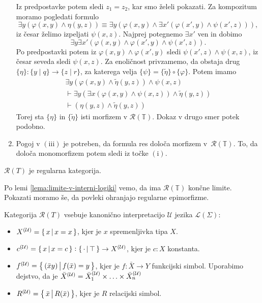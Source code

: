\documentclass[../kategoricna_logika.tex]{subfiles}
\begin{document}
\begin{dokaz}
\begin{enumerate}[label=(\roman*)]
    Iz predpostavke potem sledi $z_1 = z_2$, kar smo želeli pokazati.
    Za kompozitum moramo pogledati formulo
    \[ \exists y(\varphi(x,y) \land \eta(y,z)) \equiv
      \exists y(\varphi(x,y) \land \exists x'(\varphi(x',y) \land \psi(x',z)) ), \]
    iz česar želimo izpeljati $\psi(x,z)$. Najprej potegnemo $\exists x'$ ven in dobimo
    \[\exists y \exists x'( \varphi(x,y) \land \varphi(x',y) \land \psi(x',z)). \]
    Po predpostavki potem iz $\varphi(x,y) \land \varphi(x',y)$ sledi
    $\psi(x',z) \land \psi(x,z)$, iz česar seveda sledi $\psi(x,z)$.
    Za enoličnost privzamemo, da obstaja drug $\{\eta\} : \{y \mid q\} \to \{z \mid r\}$,
    za katerega velja $\{\psi\} = \{\tilde{\eta}\} \circ \{\varphi\}$. Potem imamo
    \begin{align*}
      \exists y (\varphi(x,y) \land \tilde{\eta}(y,z)) \land \psi(x,z) \\
      \vdash \exists y (\exists x(\varphi(x,y) \land \psi(x,z)) \land \tilde{\eta}(y,z)) \\
      \vdash (\eta(y,z) \land \tilde{\eta}(y,z))
    \end{align*}
    Torej sta $\{\eta\}$ in $\{\tilde{\eta}\}$ isti morfizem v $\mathcal{R}(\mathbb{T})$.
    Dokaz v drugo smer potek podobno.

  \item Pogoj v $(\mathrm{iii})$ je potreben,
    da formula res določa morfizem v~$\mathcal{R}(\mathbb{T})$.
    To, da določa monomorfizem potem sledi iz točke $(\mathrm{i})$.
  \end{enumerate}
  
\end{dokaz}
\begin{trditev}
  $\mathcal{R}(T)$ je regularna kategorija.
\end{trditev}
\begin{dokaz}
  Po lemi \ref{lema:limite-v-interni-logiki} vemo, da ima $\mathcal{R}(\mathbb{T})$
  končne limite. Pokazati moramo še, da povleki ohranjajo regularne epimorfizme.
\end{dokaz}
\begin{definicija}
  Kategorija $\mathcal{R}(T)$ vsebuje kanonično interpretacijo $\mathcal{U}$ jezika $\mathcal{L}(\Sigma)$:
  \begin{itemize}
    \item $\interp[\mathcal{U}]{X} = \set{x\,\middle|\, x = x}$, kjer je $x$ spremenljivka tipa $X$.
    \item $\interp[\mathcal{U}]{c} = \set{x\,\middle|\, x = c} : \set{\cdot\,\middle|\, \top} \to \interp[\mathcal{U}]{X}$, kjer je $c:X$ konstanta.
    \item $\interp[\mathcal{U}]{f} = \set{(\bar{x}y)\,\middle|\, f(\bar{x}) = y}$,
      kjer je $f : \bar{X}\to Y$ funkcijski simbol. Uporabimo dejstvo, da je $\bar{X}^{(\mathcal{U})} = \interp[\mathcal{U}]{\bar{X}_1} \times \ldots \times \interp[\mathcal{U}]{\bar{X}_n}$
    \item $\interp[\mathcal{U}]{R} = \set{\bar{x}\,\middle|\, R(\bar{x})}$, kjer je $R$ relacijski simbol.
  \end{itemize}
\end{definicija}
\end{document}
